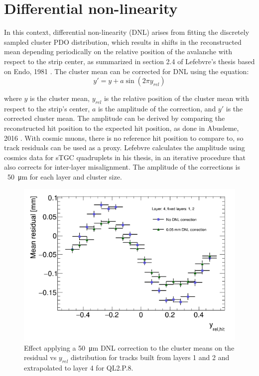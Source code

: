 \section{Differential non-linearity}
\label{appendix:systematics_dnl}

In this context, differential non-linearity (DNL) arises from fitting the discretely sampled cluster PDO distribution, which results in shifts in the reconstructed mean depending periodically on the relative position of the avalanche with respect to the strip center, as summarized in section 2.4 of Lefebvre's thesis \cite{lefebvre_thesis} based on Endo, 1981 \cite{endo_systematic_1981}. The cluster mean can be corrected for DNL using the equation:
\begin{equation}
\label{eqn:dnl_corr}
y' = y + a \sin \left( 2 \pi y_{rel} \right)
\end{equation}

where $y$ is the cluster mean, $y_{rel}$ is the relative position of the cluster mean with respect to the strip's center, $a$ is the amplitude of the correction, and $y'$ is the corrected cluster mean. The amplitude can be derived by comparing the reconstructed hit position to the expected hit position, as done in Abusleme, 2016 \cite{abusleme_performance_2016}. With cosmic muons, there is no reference hit position to compare to, so track residuals can be used as a proxy. Lefebvre calculates the amplitude using cosmics data for sTGC quadruplets in his thesis, \cite{lefebvre_thesis} in an iterative procedure that also corrects for inter-layer misalignment. The amplitude of the corrections is ~\SI{50}{\micro\meter} for each layer and cluster size. 

\begin{figure}
    \centering
    \includegraphics[width = \textwidth]{figures/figure_dnl_profiles_blue_QL2P08_3100V_2021-06-18_no_dnl_green_QL2P08_3100V_2021-06-18_2_50um_universal_DNL_layer4_fixed12.png}
    \caption{Effect applying a \SI{50}{\micro\meter} DNL correction to the cluster means on the residual vs $y_{rel}$ distribution for tracks built from layers 1 and 2 and extrapolated to layer 4 for QL2.P.8.}
    \label{fig:dnl_corr_effect}
\end{figure}

